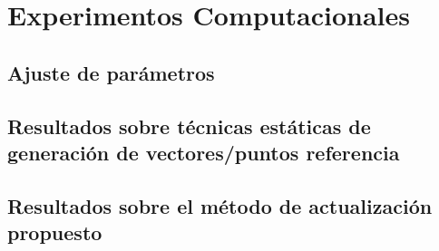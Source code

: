 \chapter{Experimentos Computacionales}

\section{Ajuste de parámetros}

\section{Resultados sobre técnicas estáticas de generación de vectores/puntos referencia}

\section{Resultados sobre el método de actualización propuesto}